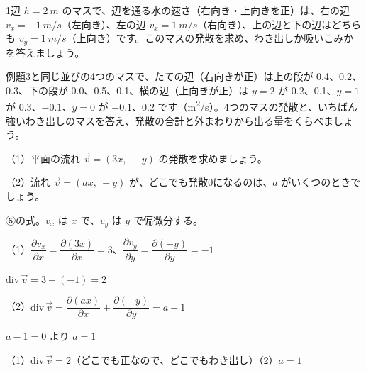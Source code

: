 \begingroup{}%
\noindent\begin{minipage}[t]{0.485\linewidth}\vspace{0pt}
\begin{jibun}
\raggedright 1辺 $h=\qty{2}{m}$ のマスで、辺を通る水の速さ（右向き・上向きを正）は、右の辺 $v_x=\qty{-1}{m/s}$（左向き）、左の辺 $v_x=\qty{1}{m/s}$（右向き）、上の辺と下の辺はどちらも $v_y=\qty{1}{m/s}$（上向き）です。このマスの発散を求め、わき出しか吸いこみかを答えましょう。
\end{jibun}
\end{minipage}\hfill
\begin{minipage}[t]{0.485\linewidth}\vspace{0pt}
\begin{jibun}
\raggedright 例題3と同じ並びの4つのマスで、たての辺（右向きが正）は上の段が 0.4、0.2、0.3、下の段が 0.0、0.5、0.1、横の辺（上向きが正）は $y=2$ が 0.2、0.1、$y=1$ が 0.3、$-0.1$、$y=0$ が $-0.1$、0.2 です（\unit{m^2/s}）。4つのマスの発散と、いちばん強いわき出しのマスを答え、発散の合計と外まわりから出る量をくらべましょう。
\end{jibun}
\end{minipage}\par
\endgroup

\begin{reidai}[式で表された平面の流れ]
（1）平面の流れ $\vec v=(3x,\ -y)$ の発散を求めましょう。\par
（2）流れ $\vec v=(ax,\ -y)$ が、どこでも発散0になるのは、$a$ がいくつのときでしょう。\par
\kangaekata ⑥の式。$v_x$ は $x$ で、$v_y$ は $y$ で偏微分する。\par
\shiki\kviiijs{}\zw{} （1）$\dfrac{\partial v_x}{\partial x}=\dfrac{\partial(3x)}{\partial x}=3$、$\dfrac{\partial v_y}{\partial y}=\dfrac{\partial(-y)}{\partial y}=-1$\par
\kviiijb $\mathrm{div}\,\vec v=3+(-1)=2$\par
\kviiija （2）$\mathrm{div}\,\vec v=\dfrac{\partial(ax)}{\partial x}+\dfrac{\partial(-y)}{\partial y}=a-1$\par
\kviiijb $a-1=0$ より $a=1$\par
\kotae\kviiijs{}\zw{} （1）$\mathrm{div}\,\vec v=2$（どこでも正なので、どこでもわき出し）\quad （2）$a=1$
\end{reidai}

